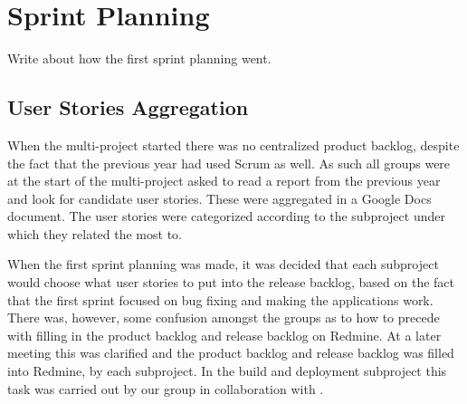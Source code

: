 \chapter{Sprint Planning}\label{chap:sprint1_planning}
Write about how the first sprint planning went.

\section{User Stories Aggregation}
When the multi-project started there was no centralized product backlog, despite the fact that the previous year had used Scrum as well. As such all groups were at the start of the multi-project asked to read a report from the previous year and look for candidate user stories. These were aggregated in a Google Docs document. The user stories were categorized according to the subproject under which they related the most to.

When the first sprint planning was made, it was decided that each subproject would choose what user stories to put into the release backlog, based on the fact that the first sprint focused on bug fixing and making the applications work. There was, however, some confusion amongst the groups as to how to precede with filling in the product backlog and release backlog on Redmine. At a later meeting this was clarified and the product backlog and release backlog was filled into Redmine, by each subproject. In the build and deployment subproject this task was carried out by our group in collaboration with .
